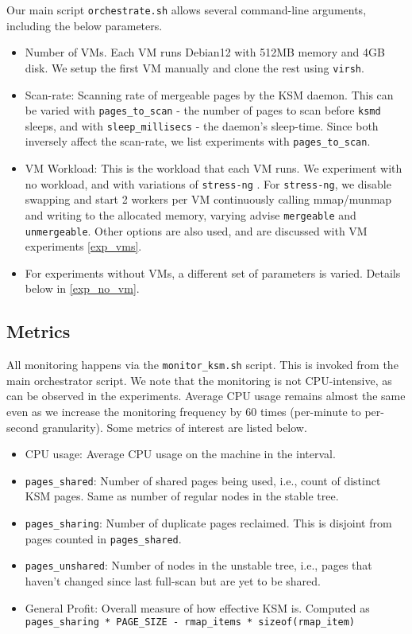 \documentclass{article}
\begin{document}
Our main script \texttt{orchestrate.sh} allows several command-line arguments, including the below parameters.

\begin{itemize}
    \item Number of VMs. Each VM runs Debian12 with 512MB memory and 4GB disk. We setup the first VM manually and clone the rest using \texttt{virsh}.
    \item Scan-rate: Scanning rate of mergeable pages by the KSM daemon. This can be varied with \texttt{pages\_to\_scan} - the number of pages to scan before \texttt{ksmd} sleeps, and with \texttt{sleep\_millisecs} - the daemon's sleep-time. Since both inversely affect the scan-rate, we list experiments with \texttt{pages\_to\_scan}.
    \item VM Workload: This is the workload that each VM runs. We experiment with no workload, and with variations of \texttt{stress-ng} \cite{stress_ng}. For \texttt{stress-ng}, we disable swapping and start 2 workers per VM continuously calling mmap/munmap and writing to the allocated memory, varying advise \texttt{mergeable} and \texttt{unmergeable}. Other options are also used, and are discussed with VM experiments \ref{exp_vms}.
    \item For experiments without VMs, a different set of parameters is varied. Details below in \ref{exp_no_vm}.
\end{itemize}

\subsection{Metrics}
\label{sec:metrics}

All monitoring happens via the \texttt{monitor\_ksm.sh} script. This is invoked from the main orchestrator script. We note that the monitoring is not CPU-intensive, as can be observed in the experiments. Average CPU usage remains almost the same even as we increase the monitoring frequency by 60 times (per-minute to per-second granularity). Some metrics of interest are listed below.

\begin{itemize}
    \item CPU usage: Average CPU usage on the machine in the interval.%
    \item \texttt{pages\_shared}: Number of shared pages being used, i.e., count of distinct KSM pages. Same as number of regular nodes in the stable tree.
    \item \texttt{pages\_sharing}: Number of duplicate pages reclaimed. This is disjoint from pages counted in \texttt{pages\_shared}.
    \item \texttt{pages\_unshared}: Number of nodes in the unstable tree, i.e., pages that haven't changed since last full-scan but are yet to be shared.
    \item General Profit: Overall measure of how effective KSM is. Computed as \newline\texttt{pages\_sharing * PAGE\_SIZE - rmap\_items * sizeof(rmap\_item)}
\end{itemize}
\end{document}
